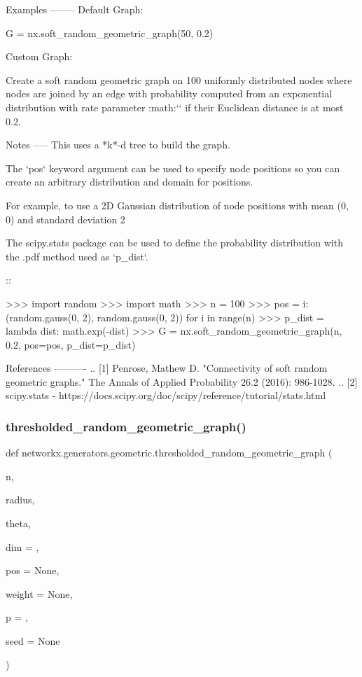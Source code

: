 \begin{DoxyVerb}
Examples
--------
Default Graph:

G = nx.soft_random_geometric_graph(50, 0.2)

Custom Graph:

Create a soft random geometric graph on 100 uniformly distributed nodes
where nodes are joined by an edge with probability computed from an
exponential distribution with rate parameter :math:`` if their
Euclidean distance is at most 0.2.

Notes
-----
This uses a *k*-d tree to build the graph.

The `pos` keyword argument can be used to specify node positions so you
can create an arbitrary distribution and domain for positions.

For example, to use a 2D Gaussian distribution of node positions with mean
(0, 0) and standard deviation 2

The scipy.stats package can be used to define the probability distribution
with the .pdf method used as `p_dist`.

::

>>> import random
>>> import math
>>> n = 100
>>> pos = {i: (random.gauss(0, 2), random.gauss(0, 2)) for i in range(n)}
>>> p_dist = lambda dist: math.exp(-dist)
>>> G = nx.soft_random_geometric_graph(n, 0.2, pos=pos, p_dist=p_dist)

References
----------
.. [1] Penrose, Mathew D. "Connectivity of soft random geometric graphs."
       The Annals of Applied Probability 26.2 (2016): 986-1028.
.. [2] scipy.stats -
       https://docs.scipy.org/doc/scipy/reference/tutorial/stats.html\end{DoxyVerb}
 \mbox{\label{namespacenetworkx_1_1generators_1_1geometric_a1924e6b8a54833447193d3ebdc2e81c4}} 
\subsubsection{\texorpdfstring{thresholded\+\_\+random\+\_\+geometric\+\_\+graph()}{thresholded\_random\_geometric\_graph()}}
{\footnotesize\ttfamily def networkx.\+generators.\+geometric.\+thresholded\+\_\+random\+\_\+geometric\+\_\+graph (\begin{DoxyParamCaption}\item[{}]{n,  }\item[{}]{radius,  }\item[{}]{theta,  }\item[{}]{dim = {},  }\item[{}]{pos = {\ttfamily None},  }\item[{}]{weight = {\ttfamily None},  }\item[{}]{p = {},  }\item[{}]{seed = {\ttfamily None} }\end{DoxyParamCaption})}

